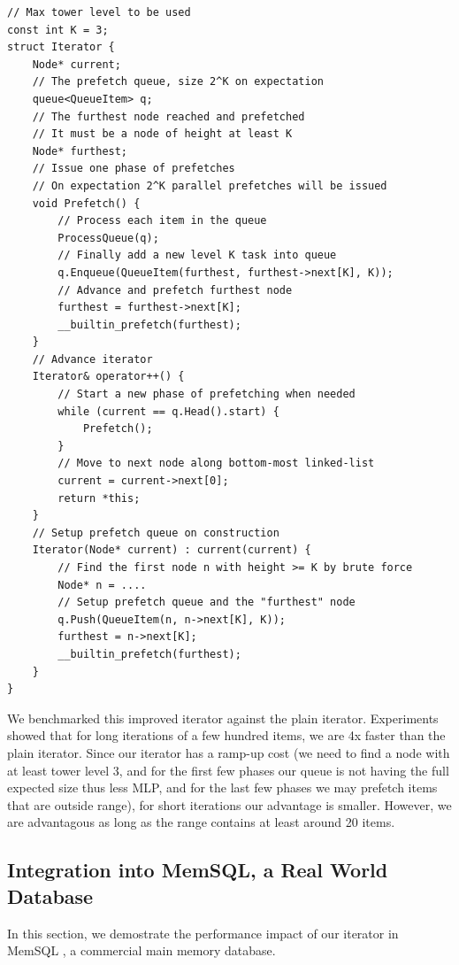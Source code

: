 \documentclass[11pt, usletter]{article}
\begin{document}
\singlespacing\begin{codebox}
\begin{verbatim}
// Max tower level to be used 
const int K = 3;
struct Iterator {
    Node* current;
    // The prefetch queue, size 2^K on expectation
    queue<QueueItem> q;
    // The furthest node reached and prefetched
    // It must be a node of height at least K
    Node* furthest;
    // Issue one phase of prefetches
    // On expectation 2^K parallel prefetches will be issued
    void Prefetch() {
        // Process each item in the queue 
        ProcessQueue(q);
        // Finally add a new level K task into queue
        q.Enqueue(QueueItem(furthest, furthest->next[K], K));
        // Advance and prefetch furthest node
        furthest = furthest->next[K];
        __builtin_prefetch(furthest);
    }
    // Advance iterator
    Iterator& operator++() {
        // Start a new phase of prefetching when needed
        while (current == q.Head().start) {
            Prefetch();
        }
        // Move to next node along bottom-most linked-list 
        current = current->next[0]; 
        return *this;
    }
    // Setup prefetch queue on construction 
    Iterator(Node* current) : current(current) {
        // Find the first node n with height >= K by brute force
        Node* n = ....
        // Setup prefetch queue and the "furthest" node
        q.Push(QueueItem(n, n->next[K], K));
        furthest = n->next[K];
        __builtin_prefetch(furthest);
    }
}
\end{verbatim}
\end{codebox}\doublespacing

We benchmarked this improved iterator against the plain iterator. 
Experiments showed that for long iterations of a few hundred items, 
we are 4x faster than the plain iterator.
Since our iterator has a ramp-up cost (we need to find a node with at least tower level 3, 
and for the first few phases our queue is not having the full expected size thus less MLP, 
and for the last few phases we may prefetch items that are outside range), 
for short iterations our advantage is smaller. 
However, we are advantagous as long as the range contains at least around 20 items.

\subsection{Integration into MemSQL, a Real World Database} \label{sliter_memsql}

In this section, we demostrate the performance impact of our iterator in MemSQL \cite{memsql}, 
a commercial main memory database.
\end{document}
